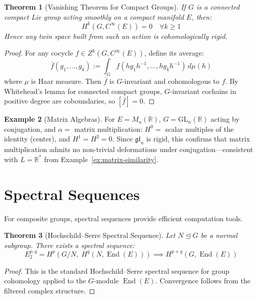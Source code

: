 \documentclass[11pt,a4paper,openany]{book}
\theoremstyle{plain}
\newtheorem{theorem}{Theorem}[chapter]
\theoremstyle{definition}
\newtheorem{example}[theorem]{Example}
\newcommand{\lingroup}{L}
\newcommand{\actspace}{E}
\newcommand{\groupG}{G}
\newcommand{\RR}{\mathbb{R}}
\newcommand{\GL}{\mathrm{GL}}
\DeclareMathOperator{\End}{End}
\begin{document}
\begin{theorem}[Vanishing Theorem for Compact Groups]\label{thm:vanishing-compact}
If $\groupG$ is a connected compact Lie group acting smoothly on a compact manifold $\actspace$, then:
\[
H^k(\groupG, C^\infty(\actspace)) = 0 \quad \forall k \geq 1
\]
Hence any twin space built from such an action is cohomologically rigid.
\end{theorem}

\begin{proof}
For any cocycle $f \in Z^k(\groupG, C^\infty(\actspace))$, define its average:
\[
\bar{f}(g_1, \ldots, g_k) := \int_\groupG f(hg_1h^{-1}, \ldots, hg_kh^{-1})\, d\mu(h)
\]
where $\mu$ is Haar measure. Then $\bar{f}$ is $\groupG$-invariant and cohomologous to $f$. By Whitehead's lemma for connected compact groups, $\groupG$-invariant cochains in positive degree are coboundaries, so $[\bar{f}] = 0$.
\end{proof}

\begin{example}[Matrix Algebras]\label{ex:matrix-cohom}
For $\actspace = M_n(\RR)$, $\groupG = \GL_n(\RR)$ acting by conjugation, and $\alpha = $ matrix multiplication: $H^0 = $ scalar multiples of the identity (center), and $H^1 = H^2 = 0$. Since $\mathfrak{gl}_n$ is rigid, this confirms that matrix multiplication admits no non-trivial deformations under conjugation---consistent with $\lingroup = \RR^*$ from Example~\ref{ex:matrix-similarity}.
\end{example}

\section{Spectral Sequences}\label{sec:spectral}

For composite groups, spectral sequences provide efficient computation tools.

\begin{theorem}[Hochschild--Serre Spectral Sequence]\label{thm:spectral-seq}
Let $N \trianglelefteq \groupG$ be a normal subgroup. There exists a spectral sequence:
\[
E_2^{p,q} = H^p(\groupG/N,\; H^q(N, \End(\actspace))) \implies H^{p+q}(\groupG, \End(\actspace))
\]
\end{theorem}

\begin{proof}
This is the standard Hochschild--Serre spectral sequence for group cohomology applied to the $\groupG$-module $\End(\actspace)$. Convergence follows from the filtered complex structure.
\end{proof}
\end{document}
